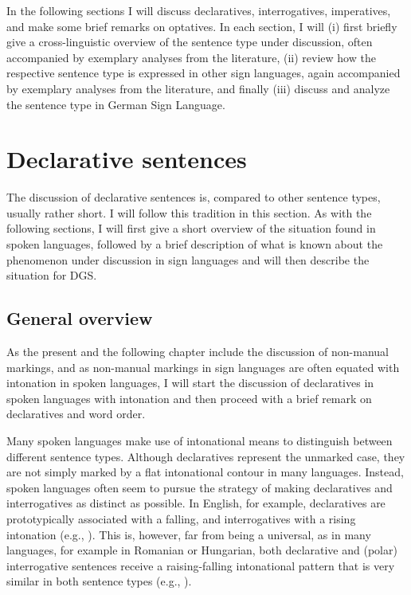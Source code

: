 In the following sections I will discuss declaratives, interrogatives, imperatives, and make some brief remarks on optatives. In each section, I will (i) first briefly give a cross-linguistic overview of the sentence type under discussion, often accompanied by exemplary analyses from the literature, (ii) review how the respective sentence type is expressed in other sign languages, again accompanied by exemplary analyses from the literature, and finally (iii) discuss and analyze the sentence type in German Sign Language.


\section{Declarative sentences}\label{declarativesentences}
The discussion of declarative sentences is, compared to other sentence types, usually rather short. I will follow this tradition in this section. As with the following sections, I will first give a short overview of the situation found in spoken languages, followed by a brief description of what is known about the phenomenon under discussion in sign languages and will then describe the situation for DGS.


\subsection{General overview}
As the present and the following chapter include the discussion of non-manual markings, and as non-manual markings in sign languages are often equated with intonation in spoken languages, I will start the discussion of declaratives in spoken languages with intonation and then proceed with a brief remark on declaratives and word order.

Many spoken languages make use of intonational means to distinguish between different sentence types. Although declaratives represent the unmarked case, they are not simply marked by a flat intonational contour in many languages. Instead, spoken languages often seem to pursue the strategy of making declaratives and interrogatives as distinct as possible. In English, for example, declaratives are prototypically associated with a falling, and interrogatives with a rising intonation (e.g., \citealt{gunlogson2002declarative}). This is, however, far from being a universal, as in many languages, for example in Romanian or Hungarian, both declarative and (polar) interrogative sentences receive a raising-falling intonational pattern that is very similar in both sentence types (e.g., \citealt{ladd1981intonational}).


